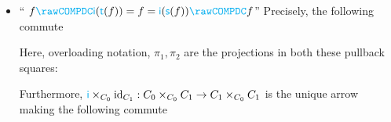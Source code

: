 \documentclass[noamsfonts, reqno]{amsart}
\newcommand\sDC{\mathcolor{cyan}{\mathsf{s}}}
\newcommand\tDC{\mathcolor{cyan}{\mathsf{t}}}
\newcommand\iDC{\mathcolor{cyan}{\mathsf{i}}}
\newcommand{\COMPDC}{\mathcolor{cyan}{\rawCOMPDC}}
\newcommand\id{\operatorname{id}}
\begin{document}
\begin{itemize}
\item
``\textbf{ $f \COMPDC \iDC( \tDC(f) ) = f = \iDC( \sDC(f) ) \COMPDC f$}''\newline
Precisely, the following commute
\begin{center}
\end{center}
Here, overloading notation, $\pi_1, \pi_2$ are the projections in both these pullback squares:
\begin{center}
\end{center}
Furthermore, $\iDC \times_{C_0} \id_{C_1}: C_0 \times_{C_0} C_1 \to C_1 \times_{C_0} C_1$ is the unique arrow making the following commute
\begin{center}

\end{center}
\end{itemize}
\end{document}
